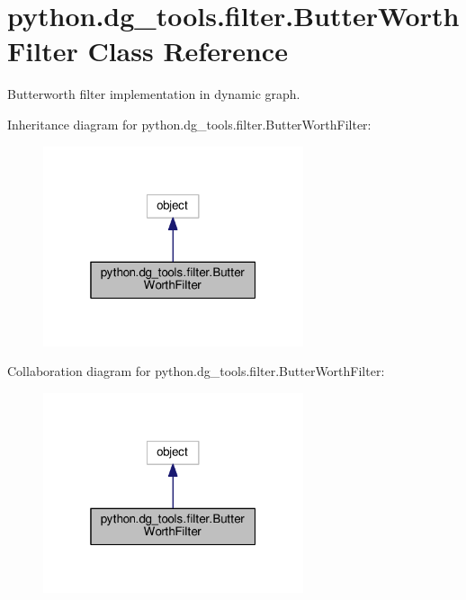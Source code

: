 \hypertarget{classpython_1_1dg__tools_1_1filter_1_1ButterWorthFilter}{}\section{python.\+dg\+\_\+tools.\+filter.\+Butter\+Worth\+Filter Class Reference}
\label{classpython_1_1dg__tools_1_1filter_1_1ButterWorthFilter}


Butterworth filter implementation in dynamic graph.  




Inheritance diagram for python.\+dg\+\_\+tools.\+filter.\+Butter\+Worth\+Filter\+:
\nopagebreak
\begin{figure}[H]
\begin{center}
\leavevmode
\includegraphics[width=217pt]{classpython_1_1dg__tools_1_1filter_1_1ButterWorthFilter__inherit__graph}
\end{center}
\end{figure}


Collaboration diagram for python.\+dg\+\_\+tools.\+filter.\+Butter\+Worth\+Filter\+:
\nopagebreak
\begin{figure}[H]
\begin{center}
\leavevmode
\includegraphics[width=217pt]{classpython_1_1dg__tools_1_1filter_1_1ButterWorthFilter__coll__graph}
\end{center}
\end{figure}
